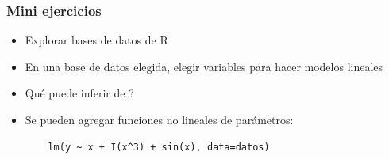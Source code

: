 \documentclass[14pt,aspectratio=169,xcolor=dvipsnames]{beamer}
\begin{document}
\begin{frame}
    \maketitle
\end{frame}
\begin{frame}\frametitle{Mini ejercicios}
    \begin{itemize}
        \item Explorar bases de datos de R
        \item En una base de datos elegida, elegir variables para hacer modelos lineales
        \item Qué puede inferir de ?
        \item Se pueden agregar funciones no lineales de parámetros:
            \begin{verbatim}
    lm(y ~ x + I(x^3) + sin(x), data=datos)
            \end{verbatim}
    \end{itemize}
\end{frame}
\end{document}
